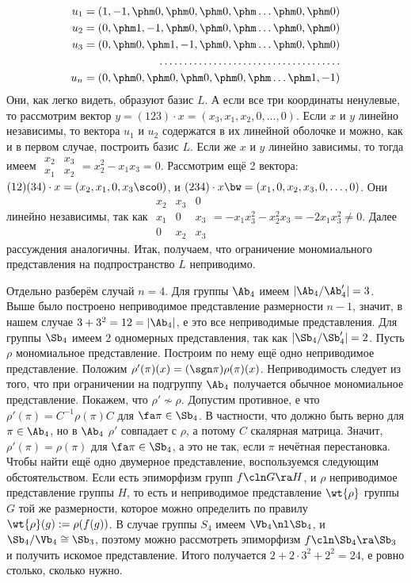 \documentclass[a4paper]{article}
\begin{document}
\begin{align*}
u_1=(1,    -1, \phm0, \phm0, \phm0, \phm\ldots \phm0, \phm0)\\
u_2=(0, \phm1,    -1, \phm0, \phm0, \phm\ldots \phm0, \phm0)\\
u_3=(0, \phm0, \phm1,    -1, \phm0, \phm\ldots \phm0, \phm0)\\
.\dots\dots\dots\dots\dots\dots\dots\dots\dots\dots\dots\dots\\
u_n=(0, \phm0, \phm0, \phm0, \phm0, \phm\ldots \phm1,    -1)
\end{align*}
Они, как легко видеть, образуют базис $L$. А если все три координаты ненулевые, то рассмотрим  вектор
$y=(123)\cdot x=(x_3, x_1, x_2,0,\ldots,0)$. Если $x$ и $y$ линейно независимы, то вектора $u_1$ и $u_2$
содержатся в их линейной оболочке и можно, как и в первом случае, построить базис $L$. Если же $x$ и $y$
линейно зависимы, то тогда имеем $\begin{array}{|cc|}x_2 & x_3 \\ x_1 & x_2\end{array} = x_2^2-x_1x_3=0$.
Рассмотрим ещё 2 вектора: $(12)(34)\cdot x=(x_2, x_1, 0, x_3 \sco 0)$, и
$(234)\cdot x \bw= (x_1,0,x_2,x_3,0,\ldots,0)$. Они линейно независимы, так как $\begin{array}{|ccc|}x_2 & x_3 & 0 \\ x_1 & 0 &
x_3 \\ 0 & x_2 & x_3\end{array}=-x_1x_3^2-x_2^2x_3=-2x_1x_3^2 \neq 0$. Далее рассуждения аналогичны. Итак,
получаем, что ограничение мономиального представления на подпространство $L$ неприводимо.

Отдельно разберём случай $n=4$. Для группы $\Ab_4$ имеем $|\Ab_4/\Ab_4'|=3$. Выше было построено
неприводимое представление размерности $n-1$, значит, в нашем случае $3+3^2=12=|\Ab_4|$, е это все
неприводимые представления. Для группы $\Sb_4$ имеем 2 одномерных представления, так как $|\Sb_4/\Sb_4'|=2$.
Пусть $\rho$ мономиальное представление. Построим по нему ещё одно неприводимое представление. Положим
$\rho'(\pi)(x)=(\sgn \pi) \rho(\pi)(x)$. Неприводимость следует из того, что при ограничении на подгруппу
$\Ab_4$ получается обычное мономиальное представление. Покажем, что $\rho' \nsim \rho$. Допустим противное,
е что $\rho'(\pi)=C^{-1}\rho(\pi)C$ для $\fa \pi \in \Sb_4$. В частности, что должно быть верно для $\pi
\in \Ab_4$, но в $\Ab_4$ $\rho'$ совпадает с $\rho$, а потому $C$ скалярная матрица. Значит,
$\rho'(\pi)=\rho(\pi)$ для $\fa \pi \in \Sb_4$, а это не так, если $\pi$ нечётная перестановка. Чтобы
найти ещё одно двумерное представление, воспользуемся следующим обстоятельством. Если есть эпиморфизм групп
$f\cln G \ra H$, и $\rho$ неприводимое представление группы $H$, то есть и неприводимое представление
$\wt{\rho}$ группы $G$ той же размерности, которое можно определить по правилу $\wt{\rho}(g):=\rho(f(g))$. В
случае группы $S_4$ имеем $\Vb_4 \nl \Sb_4$, и $\Sb_4/\Vb_4 \cong \Sb_3$, поэтому можно рассмотреть
эпиморфизм $f\cln \Sb_4 \ra \Sb_3$ и получить искомое представление. Итого получается $2+2 \cdot 3^2 + 2^2=24$,
е ровно столько, сколько нужно.
\end{document}
